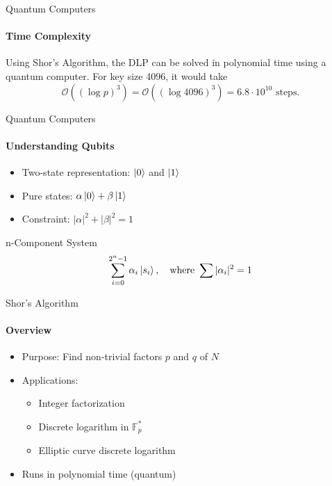\documentclass{beamer}
\begin{document}


\begin{frame}{Quantum Computers}
	\framesubtitle{Time Complexity}
	Using Shor's Algorithm, the DLP can be solved in polynomial time using a quantum computer. For key size 4096, it would take
	\pause
	\[
		\mathcal{O}\left((\log p)^{3}\right) = \mathcal{O}\left((\log 4096)^{3}\right) = 6.8 \cdot 10^{10} \text{ steps.}
	\]
\end{frame}




\begin{frame}{Quantum Computers}
	\framesubtitle{Understanding Qubits}
    \begin{itemize}
        \item Two-state representation: \(\ket{0}\) and \(\ket{1}\)
        \item Pure states: \(\alpha \ket{0} + \beta \ket{1}\)
        \item Constraint: \(|\alpha|^2 + |\beta|^2 = 1\)
    \end{itemize}
    \pause
    \begin{block}{n-Component System}
        \[ \sum_{i = 0}^{2^n - 1} \alpha_i \ket{s_i}, \quad \text{where } \sum |\alpha_i|^2 = 1 \]
    \end{block}
\end{frame}




\begin{frame}{Shor's Algorithm}
	\framesubtitle{Overview}
    \begin{itemize}
        \item Purpose: Find non-trivial factors \(p\) and \(q\) of \(N\)
        \item Applications:
            \begin{itemize}
                \item Integer factorization
                \item Discrete logarithm in \(\mathbb{F}_p^*\)
                \item Elliptic curve discrete logarithm
            \end{itemize}
        \item Runs in polynomial time (quantum)
    \end{itemize}
\end{frame}
\end{document}
